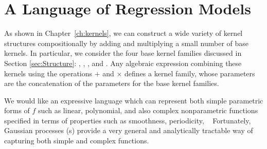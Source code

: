 




\section{A Language of Regression Models}
\label{sec:improvements}

As shown in Chapter~\ref{ch:kernels}, we can construct a wide variety of kernel structures compositionally by adding and multiplying a small number of base kernels.
In particular, we consider the four base kernel families discussed in Section \ref{sec:Structure}: \kSE, \kPer, \kLin, and \kRQ.
Any algebraic expression combining these kernels using the operations $+$ and $\times$ defines a kernel family, whose parameters are the concatenation of the parameters for the base kernel families. 



We would like an expressive language which can represent both simple parametric forms of $f$ such as linear, polynomial, \etc and also complex nonparametric functions specified in terms of properties such as smoothness, periodicity, \etc~
Fortunately, Gaussian processes (\gp{}s) provide a very general and analytically tractable way of capturing both simple and complex functions. 


